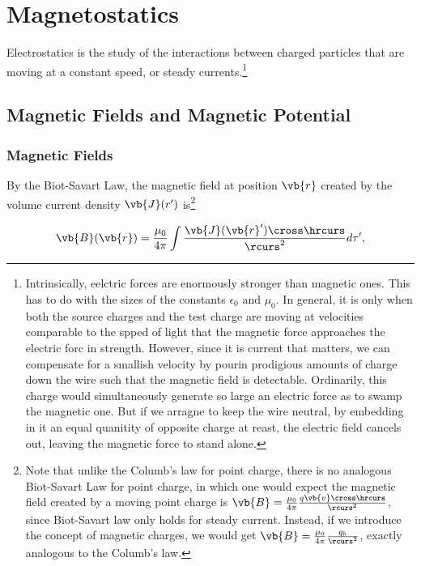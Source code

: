 \documentclass[english,a4paper,12pt]{report}
\begin{document}
\chapter{Magnetostatics}

Electrostatics is the study of the interactions between charged particles that are moving at a constant speed, or steady currents.\footnote{Intrinsically, eelctric forces are enormously stronger than magnetic ones. This has to do with the sizes of the constants \(\epsilon_0 \text { and } \mu_0 \). In general, it is only when both the source charges and the test charge are moving at velocities comparable to the spped of light that the magnetic force approaches the electric forc in strength. However, since it is current that matters, we can compensate for a smallish velocity by pourin prodigious amounts of charge down the wire such that the magnetic field is detectable. Ordinarily, this charge would simultaneously generate so large an electric force as to swamp the magnetic one. But if we arragne to keep the wire neutral, by embedding in it an equal quanitity of opposite charge at reast, the electric field cancels out, leaving the magnetic force to stand alone.} 

\section{Magnetic Fields and Magnetic Potential}

\subsection{Magnetic Fields}

By the Biot-Savart Law, the magnetic field at position \(\vb{r} \) created by the volume current density \(\vb{J} (r')\) is\footnote{Note that unlike the Columb's law for point charge, there is no analogous Biot-Savart Law for point charge, in which one would expect the magnetic field created by a moving point charge is \(\vb{B} = \frac{\mu_0}{4\pi} \frac{q \vb{v} \cross \hrcurs }{\rcurs ^2} \), since Biot-Savart law only holds for steady current. Instead, if we introduce the concept of magnetic charges, we would get \(\vb{B} = \frac{\mu_0}{4\pi} \frac{q_{b} }{\rcurs ^2} \), exactly analogous to the Columb's law.} 

\begin{equation}
    \vb{B} (\vb{r} ) = \frac{\mu _{0} }{4\pi }\int \frac{\vb{J} (\vb{r} ') \cross \hrcurs}{\rcurs ^2 } d\tau ',  
\end{equation}
\end{document}
